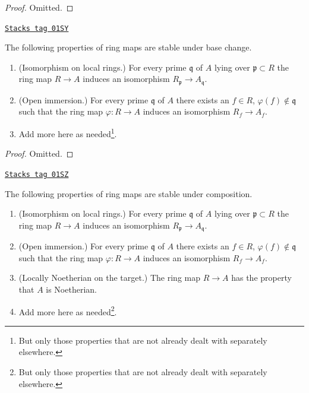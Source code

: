 \begin{proof}
Omitted.
\end{proof}

\begin{lemma}
\label{morphisms-lemma-properties-base-change}
\href{https://stacks.math.columbia.edu/tag/01SY}{\texttt{Stacks tag 01SY}}

The following properties of ring maps are stable under base change.
\begin{enumerate}
\item (Isomorphism on local rings.)
For every prime $\mathfrak q$ of $A$ lying over $\mathfrak p \subset R$
the ring map $R \to A$ induces an isomorphism
$R_{\mathfrak p} \to A_{\mathfrak q}$.
\item (Open immersion.)
For every prime $\mathfrak q$ of $A$ there exists an $f \in R$,
$\varphi(f) \not \in \mathfrak q$ such that the ring map $\varphi : R \to A$
induces an isomorphism $R_f \to A_f$.
\item Add more here as needed\footnote{But only those properties
that are not already dealt with separately elsewhere.}.
\end{enumerate}
\end{lemma}

\begin{proof}
Omitted.
\end{proof}

\begin{lemma}
\label{morphisms-lemma-properties-composition}
\href{https://stacks.math.columbia.edu/tag/01SZ}{\texttt{Stacks tag 01SZ}}

The following properties of ring maps are stable under composition.
\begin{enumerate}
\item (Isomorphism on local rings.)
For every prime $\mathfrak q$ of $A$ lying over $\mathfrak p \subset R$
the ring map $R \to A$ induces an isomorphism
$R_{\mathfrak p} \to A_{\mathfrak q}$.
\item (Open immersion.)
For every prime $\mathfrak q$ of $A$ there exists an $f \in R$,
$\varphi(f) \not \in \mathfrak q$ such that the ring map $\varphi : R \to A$
induces an isomorphism $R_f \to A_f$.
\item (Locally Noetherian on the target.)
The ring map $R \to A$ has the property that $A$ is Noetherian.
\item Add more here as needed\footnote{But only those properties
that are not already dealt with separately elsewhere.}.
\end{enumerate}
\end{lemma}

